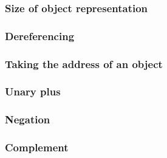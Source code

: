 \documentclass[letter,11pt]{article}
\begin{document}
\subsubsection{Size of object representation}


\subsubsection{Dereferencing}

\subsubsection{Taking the address of an object}

\subsubsection{Unary plus}

\subsubsection{Negation}


\subsubsection{Complement}
\end{document}
